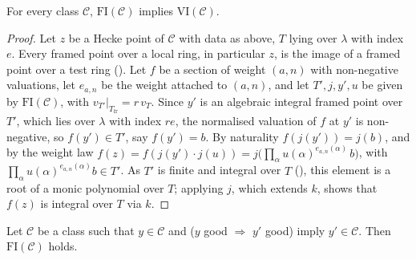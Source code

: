 \begin{lemma}\label{pf:liftinj:hvalint}
For every class $\mathcal C$, $\mathrm{FI}(\mathcal C)$ implies $\mathrm{VI}(\mathcal C)$.
\end{lemma}

\begin{proof}
Let $z$ be a Hecke point of $\mathcal C$ with data as above, $T$ lying over $\lambda$ with index $e$. Every framed point over a local ring, in particular $z$,
is the image of a framed point over a test ring (). Let $f$ be a section of weight $(a,n)$ with
non-negative valuations, let $e_{a,n}$ be the weight attached to $(a,n)$, and let $T',j,y',u$ be given by $\mathrm{FI}(\mathcal C)$, with
$v_{T'}|_{T_{\mathrm{fr}}}=r\,v_T$. Since $y'$ is an algebraic integral framed point over $T'$, which lies over $\lambda$ with index $re$, the normalised
valuation of $f$ at $y'$ is non-negative, so $f(y')\in T'$, say $f(y')=b$. By naturality $f(j(y'))=j(b)$, and by the weight law
$f(z)=f(j(y')\cdot j(u))=j\bigl(\prod_\alpha u(\alpha)^{e_{a,n}(\alpha)}\,b\bigr)$, with $\prod_\alpha u(\alpha)^{e_{a,n}(\alpha)}b\in T'$. As $T'$ is finite and
integral over $T$ (), this element is a root of a monic polynomial over $T$;
applying $j$, which extends $k$, shows that $f(z)$ is integral over $T$ via $k$.
\end{proof}

\begin{lemma}\label{pf:liftinj:hframeint}
Let $\mathcal C$ be a class such that $y\in\mathcal C$ and ($y$ good $\Rightarrow$ $y'$ good) imply $y'\in\mathcal C$. Then $\mathrm{FI}(\mathcal C)$ holds.
\end{lemma}

